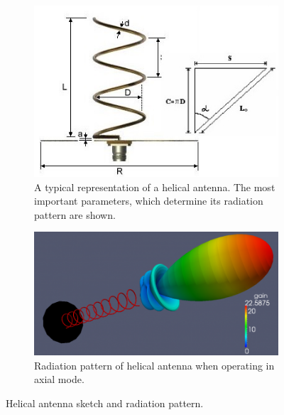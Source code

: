 \begin{figure}[h]
\centering
    \begin{subfigure}{.49\textwidth}
    \captionsetup{width=0.8\textwidth}
        \centering
        \includegraphics[width=1\textwidth]{figures/Yannis/helix.jpg}
        \caption{A typical representation of a helical antenna. The most important parameters, which determine its radiation pattern are shown. \cite{helix}}
        \label{helix1}
    \end{subfigure}
    \begin{subfigure}{.49\textwidth}
        \captionsetup{width=0.8\textwidth}
        \centering
        \includegraphics[width=1\linewidth]{figures/Yannis/H2.png}
        \caption{Radiation pattern of helical antenna when operating in axial mode. \cite{helix}}
        \label{helix_pat}
    \end{subfigure}
    \caption{Helical antenna sketch and radiation pattern.}
    \label{helical}
\end{figure}

